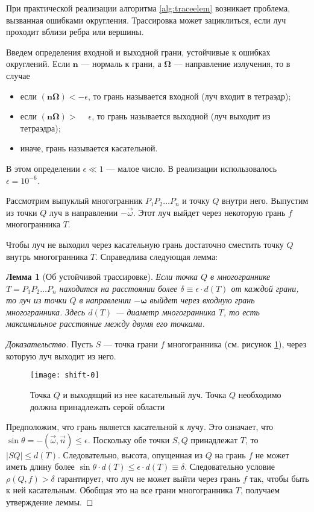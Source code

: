При практической реализации алгоритма \ref{alg:traceelem} возникает проблема, вызванная ошибками округления. Трассировка может зациклиться, если луч проходит вблизи ребра или вершины.

Введем определения входной и выходной грани, устойчивые к ошибках округлений.
Если $\mathbf n$ --- нормаль к грани, а $\boldsymbol \Omega$ --- направление излучения, то в случае
\begin{itemize}
\item если $(\mathbf n \boldsymbol \Omega) < -\epsilon$, то грань называется входной (луч входит в тетраэдр);
\item если $(\mathbf n \boldsymbol \Omega) > \phantom{-}\epsilon$, то грань называется выходной (луч выходит из тетраэдра);
\item иначе, грань называется касательной.
\end{itemize}
В этом определении $\epsilon \ll 1$ --- малое число. В реализации использовалось $\epsilon = 10^{-6}$.

Рассмотрим выпуклый многогранник $P_1P_2\dots P_n$ и точку $Q$ внутри него. Выпустим из точки $Q$ 
луч в направлении $-\vec\omega$. Этот луч выйдет через некоторую грань $f$ многогранника $T$.

Чтобы луч не выходил через касательную грань достаточно сместить точку $Q$ внутрь многогранника 
$T$. Справедлива следующая лемма:
\newtheorem{lemma}{Лемма}
\begin{lemma}[Об устойчивой трассировке]
Если точка $Q$ в многограннике $T = P_1P_2\dots P_n$ находится на расстоянии более $\delta 
\equiv \epsilon \cdot d(T)$ от каждой грани, то луч из точки $Q$ в направлении
$-\boldsymbol \omega$ выйдет через входную грань многогранника. Здесь $d(T)$ --- диаметр 
многогранника $T$, то есть максимальное расстояние между двумя его точками.
\end{lemma}
\begin{proof}[Доказательство]
Пусть $S$ --- точка грани $f$ многогранника (см. рисунок \ref{fig:touch}), через которую луч выходит из него.
\begin{figure}[ht!]
\centering
\texttt{[image: shift-0]}
\caption{Точка $Q$ и выходящий из нее касательный луч. Точка $Q$ необходимо должна принадлежать 
серой области}
\label{fig:touch}
\end{figure}


Предположим, что грань является касательной к лучу. Это означает, что $\sin \theta = -(\vec \omega, 
\vec n) \leqslant \epsilon$. Поскольку обе точки $S,Q$ принадлежат $T$, то $|SQ| \leq d(T)$. 
Следовательно, высота, опущенная из $Q$ на грань $f$ не может иметь длину более $\sin \theta \cdot 
d(T) \leq \epsilon \cdot d(T) \equiv \delta$. Следовательно условие $\rho(Q, f) > \delta$ 
гарантирует, что луч не может выйти через грань $f$ так, чтобы быть к ней касательным. Обобщая это 
на все грани многогранника $T$, получаем утверждение леммы.
\end{proof}

